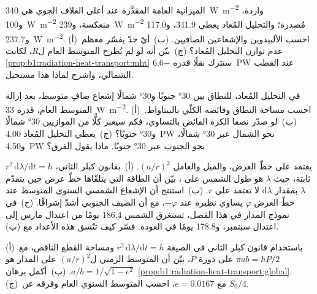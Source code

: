 \begin{exercise}[$\star\star$]\label{exo:b1:radiation-heat-transport:8}
الميزانية العامة المقدَّرة عند أعلى الغلاف الجوي هي \qty{340}{W.m^{-2}} واردة، و\qty{100}{W.m^{-2}} منعكسة، و\qty{239}{W.m^{-2}} مُصدرة؛ والتحليل المُعاد يعطي \qty{341.9}{}، و\qty{117.0}{} و\qty{237.7}{W.m^{-2}}. (أ)~احسب الألبيدوين والإشعاعين الصافيين. (ب)~أيّ حدّ يفسّر معظم عدم توازن التحليل المُعاد؟ (ج)~بيّن أنه لو لم يُطرح المتوسط العام ل$R$، لكانت \cref{prop:b1:radiation-heat-transport:mht} ستترك نقلًا قدره \qty{-6.6}{PW} عند القطب الشمالي، واشرح لماذا هذا مستحيل.
\end{exercise}

\begin{exercise}[$\star\star$]\label{exo:b1:radiation-heat-transport:9}
في التحليل المُعاد، للنطاق بين \ang{30} جنوبًا و\ang{30} شمالًا إشعاع صافٍ متوسط، بعد إزالة المتوسط العام، قدره \qty{+33}{W.m^{-2}}. (أ)~احسب مساحة النطاق وفائضه الكلّي بالبيتاواط. (ب)~لو صدّر نصفا الكرة الفائض بالتساوي، فكم سيعبر كلًّا من الموازيين \ang{30} شمالًا و\ang{30} جنوبًا؟ (ج)~يعطي التحليل المُعاد \qty{4.00}{PW} نحو الشمال عبر \ang{30} شمالًا، و\qty{4.50}{PW} نحو الجنوب عبر \ang{30} جنوبًا. ماذا يقول الفرق؟
\end{exercise}

\begin{exercise}[$\star\star\star$]\label{exo:b1:radiation-heat-transport:10}
يعتمد  على خطّ العرض، والميل والعامل
$(a/r)^2$. (أ)~بقانون كبلر الثاني، $r^2\,\mathrm d\lambda/\mathrm dt = h$ ثابتة، حيث $\lambda$ هو طول الشمس على ، بيّن أن الطاقة التي يتلقّاها خطّ عرض حين يتقدّم $\lambda$ بمقدار $\mathrm d\lambda$ لا تعتمد على
$r$. (ب)~استنتج أن الإشعاع الشمسي السنوي المتوسط عند خطّ العرض $\varphi$ يساوي نظيره عند
$-\varphi$، مع أن الصيف الجنوبي أشدّ إشراقًا. (ج)~في نموذج المدار في هذا الفصل، تستغرق الشمس \num{186.4} يومًا من اعتدال مارس إلى اعتدال سبتمبر، و\num{178.8} يومًا في العودة. فسّر كيف تتّسق هذه الأعداد مع (ب).
\end{exercise}

\begin{exercise}[$\star\star\star$]\label{exo:b1:radiation-heat-transport:11}
(أ)~باستخدام قانون كبلر الثاني في الصيغة $r^2\,\mathrm d\lambda/\mathrm dt = h$
ومساحة القطع الناقص، مع $\pi a b = hP/2$ على دورة $P$، بيّن أن المتوسط الزمني ل$(a/r)^2$ على المدار هو $a/b = 1/\sqrt{1 - e^2}$. (ب)~أكمل برهان \cref{prop:b1:radiation-heat-transport:global}. (ج)~مع $e = 0.0167$، احسب المتوسط السنوي العام وفرقه عن $S_0/4$.
\end{exercise}


